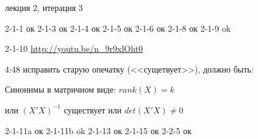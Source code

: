 \documentclass[12pt,a4paper]{article}
\begin{document}
лекция 2, итерация 3

2-1-1 ок
2-1-3 ок
2-1-4 ок
2-1-5 ок
2-1-6 ок
2-1-8 ок
2-1-9 ok
\vspace{1cm}

2-1-10 \url{http://youtu.be/n_9r9xlOht0}

4:48 исправить старую опечатку (<<сущетвует>>), должно быть: 

Синонимы в матричном виде: $rank(X)=k$

или $(X'X)^{-1}$ существует или $det(X'X)\neq 0$

\vspace{1cm}
2-1-11a ок
2-1-11b ok
2-1-13 ок
2-1-15 ок
2-2-5 ок
\end{document}
